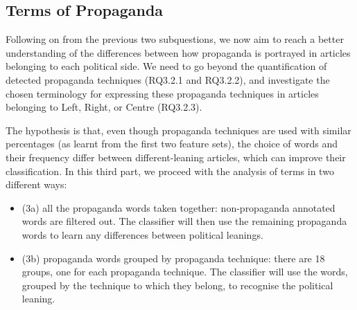 \subsection{Terms of Propaganda}
\label{ssec:ps_prop_leaning_classifier_terms}

Following on from the previous two subquestions, we now aim to reach a better understanding of the differences between how propaganda is portrayed in articles belonging to each political side.
We need to go beyond the quantification of detected propaganda techniques (RQ3.2.1 and RQ3.2.2), and investigate the chosen terminology for expressing these propaganda techniques in articles belonging to Left, Right, or Centre (RQ3.2.3). %

The hypothesis is that, even though propaganda techniques are used with similar percentages (as learnt from the first two feature sets), the choice of words and their frequency differ between different-leaning articles, which can improve their classification. 
%
In this third part, we proceed with the analysis of terms in two different ways:
\begin{itemize}
    \item (3a) all the propaganda words taken together: non-propaganda annotated words are filtered out. The classifier will then use the remaining propaganda words to learn any differences between political leanings. 
    \item (3b) propaganda words grouped by propaganda technique: there are 18 groups, one for each propaganda technique. The classifier will use the words, grouped by the technique to which they belong, to recognise the political leaning.
\end{itemize}

